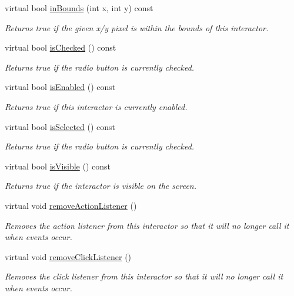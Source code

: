 \begin{DoxyCompactItemize}
virtual bool \mbox{\hyperlink{classsgl_1_1GInteractor_ae6d7982c1c627b677a5e776ca86118ed}{in\+Bounds}} (int x, int y) const
\begin{DoxyCompactList}\small\item\em Returns true if the given x/y pixel is within the bounds of this interactor. \end{DoxyCompactList}\item 
virtual bool \mbox{\hyperlink{classsgl_1_1GRadioButton_ac8cada18b9357ff68b26e17f44294764}{is\+Checked}} () const
\begin{DoxyCompactList}\small\item\em Returns true if the radio button is currently checked. \end{DoxyCompactList}\item 
virtual bool \mbox{\hyperlink{classsgl_1_1GInteractor_aacb819fb241851fd9fc045271baa4034}{is\+Enabled}} () const
\begin{DoxyCompactList}\small\item\em Returns true if this interactor is currently enabled. \end{DoxyCompactList}\item 
virtual bool \mbox{\hyperlink{classsgl_1_1GRadioButton_a56a065a2c20a230931de0ed98019d8fb}{is\+Selected}} () const
\begin{DoxyCompactList}\small\item\em Returns true if the radio button is currently checked. \end{DoxyCompactList}\item 
virtual bool \mbox{\hyperlink{classsgl_1_1GInteractor_a9d8a6cfb13917785c143e74d40e4e2be}{is\+Visible}} () const
\begin{DoxyCompactList}\small\item\em Returns true if the interactor is visible on the screen. \end{DoxyCompactList}\item 
virtual void \mbox{\hyperlink{classsgl_1_1GInteractor_ab7fe7a876367b87cf7202f947f1d05e4}{remove\+Action\+Listener}} ()
\begin{DoxyCompactList}\small\item\em Removes the action listener from this interactor so that it will no longer call it when events occur. \end{DoxyCompactList}\item 
virtual void \mbox{\hyperlink{classsgl_1_1GInteractor_ad39d0325cde6b97ebda4b9d7787c633b}{remove\+Click\+Listener}} ()
\begin{DoxyCompactList}\small\item\em Removes the click listener from this interactor so that it will no longer call it when events occur. \end{DoxyCompactList}\item 

\end{DoxyCompactItemize}
